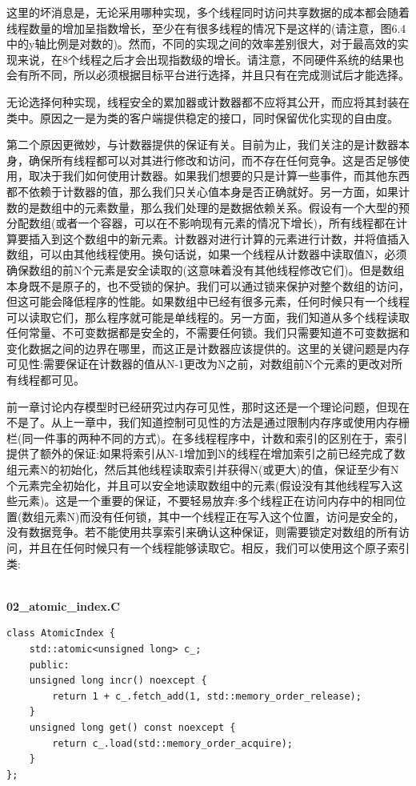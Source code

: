 这里的坏消息是，无论采用哪种实现，多个线程同时访问共享数据的成本都会随着线程数量的增加呈指数增长，至少在有很多线程的情况下是这样的(请注意，图6.4中的y轴比例是对数的)。然而，不同的实现之间的效率差别很大，对于最高效的实现来说，在8个线程之后才会出现指数级的增长。请注意，不同硬件系统的结果也会有所不同，所以必须根据目标平台进行选择，并且只有在完成测试后才能选择。

无论选择何种实现，线程安全的累加器或计数器都不应将其公开，而应将其封装在类中。原因之一是为类的客户端提供稳定的接口，同时保留优化实现的自由度。

第二个原因更微妙，与计数器提供的保证有关。目前为止，我们关注的是计数器本身，确保所有线程都可以对其进行修改和访问，而不存在任何竞争。这是否足够使用，取决于我们如何使用计数器。如果我们想要的只是计算一些事件，而其他东西都不依赖于计数器的值，那么我们只关心值本身是否正确就好。另一方面，如果计数的是数组中的元素数量，那么我们处理的是数据依赖关系。假设有一个大型的预分配数组(或者一个容器，可以在不影响现有元素的情况下增长)，所有线程都在计算要插入到这个数组中的新元素。计数器对进行计算的元素进行计数，并将值插入数组，可以由其他线程使用。换句话说，如果一个线程从计数器中读取值N，必须确保数组的前N个元素是安全读取的(这意味着没有其他线程修改它们)。但是数组本身既不是原子的，也不受锁的保护。我们可以通过锁来保护对整个数组的访问，但这可能会降低程序的性能。如果数组中已经有很多元素，任何时候只有一个线程可以读取它们，那么程序就可能是单线程的。另一方面，我们知道从多个线程读取任何常量、不可变数据都是安全的，不需要任何锁。我们只需要知道不可变数据和变化数据之间的边界在哪里，而这正是计数器应该提供的。这里的关键问题是内存可见性:需要保证在计数器的值从N-1更改为N之前，对数组前N个元素的更改对所有线程都可见。

前一章讨论内存模型时已经研究过内存可见性，那时这还是一个理论问题，但现在不是了。从上一章中，我们知道控制可见性的方法是通过限制内存序或使用内存栅栏(同一件事的两种不同的方式)。在多线程程序中，计数和索引的区别在于，索引提供了额外的保证:如果将索引从N-1增加到N的线程在增加索引之前已经完成了数组元素N的初始化，然后其他线程读取索引并获得N(或更大)的值，保证至少有N个元素完全初始化，并且可以安全地读取数组中的元素(假设没有其他线程写入这些元素)。这是一个重要的保证，不要轻易放弃:多个线程正在访问内存中的相同位置(数组元素N)而没有任何锁，其中一个线程正在写入这个位置，访问是安全的，没有数据竞争。若不能使用共享索引来确认这种保证，则需要锁定对数组的所有访问，并且在任何时候只有一个线程能够读取它。相反，我们可以使用这个原子索引类:

\hspace*{\fill} \\ %
\noindent
\textbf{02\_atomic\_index.C}
\begin{lstlisting}[style=styleCXX]
class AtomicIndex {
	std::atomic<unsigned long> c_;
	public:
	unsigned long incr() noexcept {
		return 1 + c_.fetch_add(1, std::memory_order_release);
	}
	unsigned long get() const noexcept {
		return c_.load(std::memory_order_acquire);
	}
};
\end{lstlisting}

